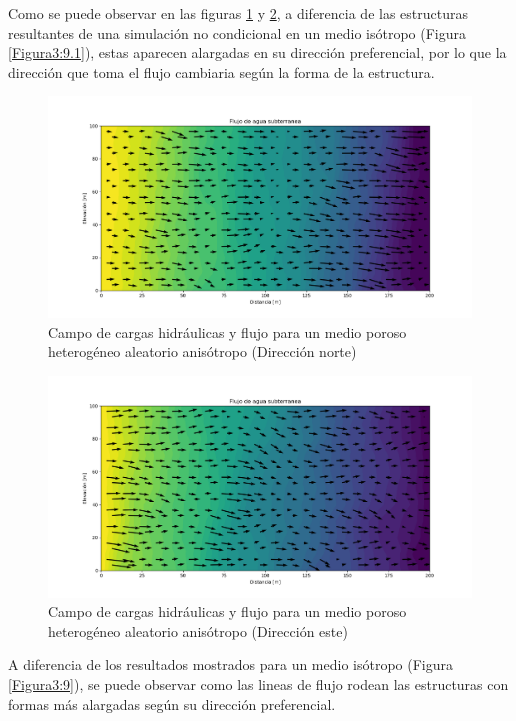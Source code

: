 Como se puede observar en las figuras \ref{Figura3:10} y \ref{Figura3:11}, a diferencia de las estructuras resultantes de una simulación no condicional en un medio isótropo (Figura \ref{Figura3:9.1}), estas aparecen alargadas en su dirección preferencial, por lo que la dirección que toma el flujo cambiaria según la forma de la estructura.

\begin{figure}[H]
\centering
\includegraphics[scale=0.50]{Figura_40}
\caption{ Campo de cargas hidráulicas y flujo para un medio poroso heterogéneo aleatorio anisótropo (Dirección norte) }
\label{Figura3:10}
\end{figure}

 \begin{figure}[H]
\centering
\includegraphics[scale=0.50]{Figura_41}
\caption{ Campo de cargas hidráulicas y flujo para un medio poroso heterogéneo aleatorio anisótropo (Dirección este) }
\label{Figura3:11}
\end{figure} 

A diferencia de los resultados mostrados para un medio isótropo (Figura \ref{Figura3:9}), se puede observar como las lineas de flujo rodean las estructuras con formas más alargadas según su dirección preferencial. 
 
\newpage

